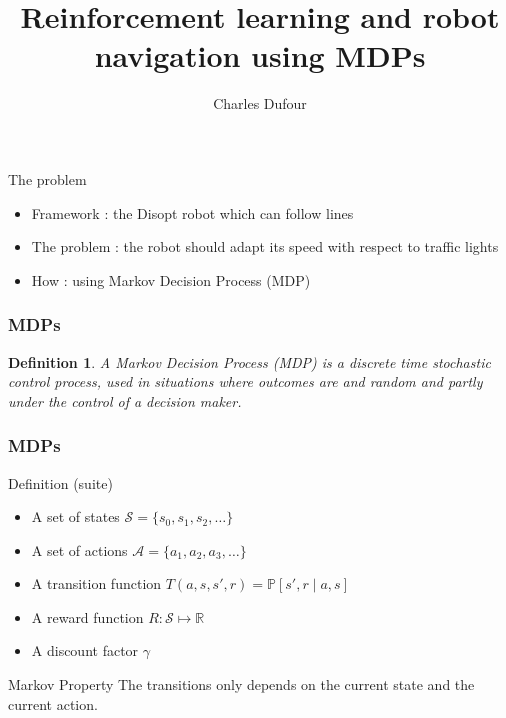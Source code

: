 \documentclass[11pt]{beamer}
\author{Charles Dufour}
\title{Reinforcement learning and robot navigation using MDPs}
\newtheorem{madef}{Definition}
\begin{document}
\begin{frame}
\titlepage
\end{frame}




\begin{frame}
\begin{block}{The problem}

  \begin{itemize}
   \item Framework : the Disopt robot which can follow lines
   \item The problem : the robot should adapt its speed with           respect to traffic lights
   \item How : using Markov Decision Process (MDP)
  \end{itemize}
\end{block} 
\end{frame}


\begin{frame}
\frametitle{MDPs}
\begin{madef}
A Markov Decision Process (MDP) is a discrete time stochastic control process, used in situations where outcomes are and random and partly under the control of a decision maker. 

\end{madef}
\end{frame}

\begin{frame}
\frametitle{MDPs}
\begin{block}{Definition (suite)}
\begin{itemize}
\item A set of states $\mathcal{S}=\{s_0,s_1,s_2,\ldots\}$
\item A set of actions $\mathcal{A}=\{a_1,a_2,a_3,\ldots\}$
\item A transition function $T(a,s,s',r) = \mathbb{P}[s',r\mid a,s]$
\item A reward function $R: \mathcal{S}\mapsto \mathbb{R}$
\item A discount factor $\gamma$ 
\end{itemize}
\end{block}

\begin{block}{Markov Property}
The transitions only depends on the current state and the current action.
\end{block}
\end{frame}
\end{document}
